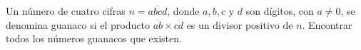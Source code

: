 Un número de cuatro cifras $n=\overline{a b c d}$, donde $a, b, c$ y $d$ son dígitos, con $a \neq 0$, se denomina guanaco si el producto $\overline{a b} \times \overline{c d}$ es un divisor positivo de $n$. Encontrar todos los números guanacos que existen.
